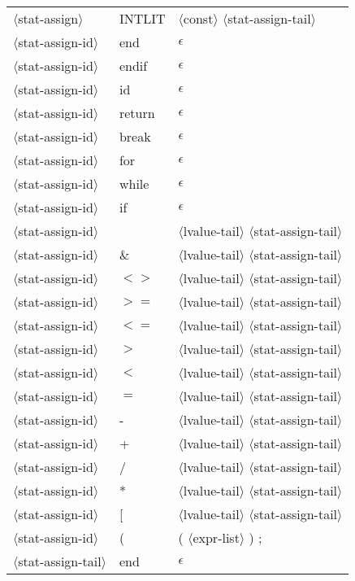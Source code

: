 \documentclass[11pt, fleqn]{article}
\newcommand{\atag}[1]{$\langle$#1$\rangle$}
\begin{document}
\begin{longtable}{l|l|l}
\atag{stat-assign}				&	INTLIT		&	\atag{const}	 \atag{stat-assign-tail}		\\
\atag{stat-assign-id}			&	end			&	$\epsilon$			\\
\atag{stat-assign-id}			&	endif		&	$\epsilon$			\\
\atag{stat-assign-id}			&	id			&	$\epsilon$			\\
\atag{stat-assign-id}			&	return		&	$\epsilon$			\\
\atag{stat-assign-id}			&	break		&	$\epsilon$			\\
\atag{stat-assign-id}			&	for			&	$\epsilon$			\\
\atag{stat-assign-id}			&	while		&	$\epsilon$			\\
\atag{stat-assign-id}			&	if			&	$\epsilon$			\\
\atag{stat-assign-id}			&	\textbar		&	\atag{lvalue-tail} \atag{stat-assign-tail}			\\
\atag{stat-assign-id}			&	\&			&	\atag{lvalue-tail} \atag{stat-assign-tail}			\\
\atag{stat-assign-id}			&	$<>$			&	\atag{lvalue-tail} \atag{stat-assign-tail}			\\
\atag{stat-assign-id}			&	$>=$			&	\atag{lvalue-tail} \atag{stat-assign-tail}			\\
\atag{stat-assign-id}			&	$<=$			&	\atag{lvalue-tail} \atag{stat-assign-tail}			\\
\atag{stat-assign-id}			&	$>$			&	\atag{lvalue-tail} \atag{stat-assign-tail}			\\
\atag{stat-assign-id}			&	$<$			&	\atag{lvalue-tail} \atag{stat-assign-tail}			\\
\atag{stat-assign-id}			&	$=$			&	\atag{lvalue-tail} \atag{stat-assign-tail}			\\
\atag{stat-assign-id}			&	-			&	\atag{lvalue-tail} \atag{stat-assign-tail}			\\
\atag{stat-assign-id}			&	+			&	\atag{lvalue-tail} \atag{stat-assign-tail}			\\
\atag{stat-assign-id}			&	/			&	\atag{lvalue-tail} \atag{stat-assign-tail}			\\
\atag{stat-assign-id}			&	*			&	\atag{lvalue-tail} \atag{stat-assign-tail}			\\
\atag{stat-assign-id}			&	[			&	\atag{lvalue-tail} \atag{stat-assign-tail}			\\
\atag{stat-assign-id}			&	(			&	( \atag{expr-list} ) ;			\\
\atag{stat-assign-tail}			&	end			&	$\epsilon$	\\

\end{longtable}
\end{document}
